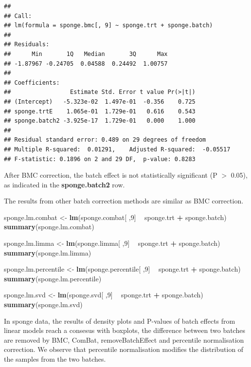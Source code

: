 \documentclass[]{book}
\newenvironment{Shaded}{\begin{snugshade}}{\end{snugshade}}
\newcommand{\KeywordTok}[1]{\textcolor[rgb]{0.13,0.29,0.53}{\textbf{#1}}}
\newcommand{\DecValTok}[1]{\textcolor[rgb]{0.00,0.00,0.81}{#1}}
\newcommand{\StringTok}[1]{\textcolor[rgb]{0.31,0.60,0.02}{#1}}
\newcommand{\OperatorTok}[1]{\textcolor[rgb]{0.81,0.36,0.00}{\textbf{#1}}}
\newcommand{\NormalTok}[1]{#1}
\begin{document}
\begin{verbatim}
## 
## Call:
## lm(formula = sponge.bmc[, 9] ~ sponge.trt + sponge.batch)
## 
## Residuals:
##      Min       1Q   Median       3Q      Max 
## -1.87967 -0.24705  0.04588  0.24492  1.00757 
## 
## Coefficients:
##                 Estimate Std. Error t value Pr(>|t|)
## (Intercept)   -5.323e-02  1.497e-01  -0.356    0.725
## sponge.trtE    1.065e-01  1.729e-01   0.616    0.543
## sponge.batch2 -3.925e-17  1.729e-01   0.000    1.000
## 
## Residual standard error: 0.489 on 29 degrees of freedom
## Multiple R-squared:  0.01291,    Adjusted R-squared:  -0.05517 
## F-statistic: 0.1896 on 2 and 29 DF,  p-value: 0.8283
\end{verbatim}

After BMC correction, the batch effect is not statistically significant
(P \(>\) 0.05), as indicated in the \textbf{sponge.batch2} row.

The results from other batch correction methods are similar as BMC
correction.

\begin{Shaded}
\begin{Highlighting}[]
\NormalTok{sponge.lm.combat <-}\StringTok{ }\KeywordTok{lm}\NormalTok{(sponge.combat[ ,}\DecValTok{9}\NormalTok{] }\OperatorTok{~}\StringTok{ }\NormalTok{sponge.trt }\OperatorTok{+}\StringTok{ }\NormalTok{sponge.batch)}
\KeywordTok{summary}\NormalTok{(sponge.lm.combat)}

\NormalTok{sponge.lm.limma <-}\StringTok{ }\KeywordTok{lm}\NormalTok{(sponge.limma[ ,}\DecValTok{9}\NormalTok{] }\OperatorTok{~}\StringTok{ }\NormalTok{sponge.trt }\OperatorTok{+}\StringTok{ }\NormalTok{sponge.batch)}
\KeywordTok{summary}\NormalTok{(sponge.lm.limma)}

\NormalTok{sponge.lm.percentile <-}\StringTok{ }\KeywordTok{lm}\NormalTok{(sponge.percentile[ ,}\DecValTok{9}\NormalTok{] }\OperatorTok{~}\StringTok{ }\NormalTok{sponge.trt }\OperatorTok{+}\StringTok{ }\NormalTok{sponge.batch)}
\KeywordTok{summary}\NormalTok{(sponge.lm.percentile)}

\NormalTok{sponge.lm.svd <-}\StringTok{ }\KeywordTok{lm}\NormalTok{(sponge.svd[ ,}\DecValTok{9}\NormalTok{] }\OperatorTok{~}\StringTok{ }\NormalTok{sponge.trt }\OperatorTok{+}\StringTok{ }\NormalTok{sponge.batch)}
\KeywordTok{summary}\NormalTok{(sponge.lm.svd)}
\end{Highlighting}
\end{Shaded}

In sponge data, the results of density plots and P-values of batch
effects from linear models reach a consesus with boxplots, the
difference between two batches are removed by BMC, ComBat,
removeBatchEffect and percentile normalisation correction. We observe
that percentile normalisation modifies the distribution of the samples
from the two batches.
\end{document}
